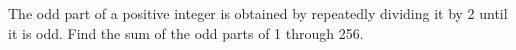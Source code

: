 The odd part of a positive integer is obtained by repeatedly dividing it by 2 until it is odd. Find the sum of the odd parts of 1 through 256.
